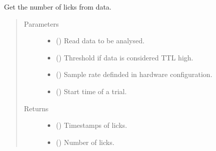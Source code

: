 \documentclass[letterpaper,10pt,english]{sphinxmanual}
\begin{document}
\begin{fulllineitems}
\label{\detokenize{NoSeMazeController/TrialLogic:TrialLogic.TrialConditions.licks_number}}
\pysigstartsignatures
{}
\pysigstopsignatures
\sphinxAtStartPar
Get the number of licks from data.
\begin{quote}\begin{description}
\item[{Parameters}] \leavevmode\begin{itemize}
\item {} 
\sphinxAtStartPar
{} () \textendash{} Read data to be analysed.

\item {} 
\sphinxAtStartPar
{} () \textendash{} Threshold if data is considered TTL high.

\item {} 
\sphinxAtStartPar
{} () \textendash{} Sample rate definded in hardware configuration.

\item {} 
\sphinxAtStartPar
{} () \textendash{} Start time of a trial.

\end{itemize}

\item[{Returns}] \leavevmode
\sphinxAtStartPar
\begin{itemize}
\item {} 
\sphinxAtStartPar
{} () \textendash{} Timestamps of licks.

\item {} 
\sphinxAtStartPar
{} () \textendash{} Number of licks.

\end{itemize}


\end{description}\end{quote}

\end{fulllineitems}
\end{document}
